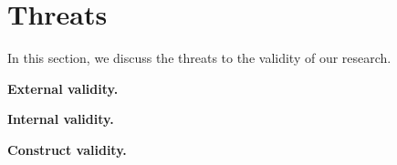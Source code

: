 \section{Threats}
\label{threats}
In this section, we discuss the threats to the validity of our research.

\textbf{External validity.}


\textbf{Internal validity.}


\textbf{Construct validity.}
